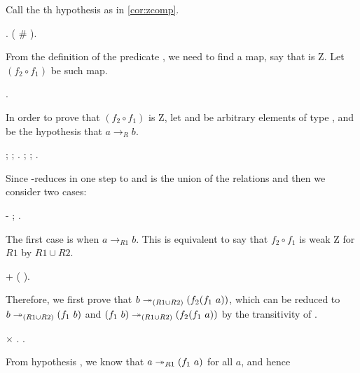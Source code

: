   Call  the th hypothesis as in \ref{cor:zcomp}. \begin{coqdoccode}
\coqdocemptyline
\coqdocindent{1.00em}
 . \coqdoctac{\ensuremath{\exists}} ( \# ). \end{coqdoccode}
From the definition of the
  predicate , we need to find a map, say  that is Z. Let
  $(f_2 \circ f_1)$ be such map.  \begin{coqdoccode}
\coqdocemptyline
\coqdocindent{1.00em}
   . \end{coqdoccode}
In order to prove that $(f_2 \circ f_1)$ is Z,
  let  and  be arbitrary elements of type , and  be the
  hypothesis that $a \to_{R} b$. \begin{coqdoccode}
\coqdocemptyline
\coqdocindent{1.00em}
 ; ;  .  ; ;  . \end{coqdoccode}
  Since  -reduces in one step to  and  is the union of the
  relations  and  then we consider two cases: \begin{coqdoccode}
\coqdocemptyline
\coqdocindent{1.00em}
-  ; . \end{coqdoccode}
The first case is when $a \to_{R1}
    b$. This is equivalent to say that $f_2 \circ f_1$ is weak Z for
    $R1$ by $R1 \cup R2$. \begin{coqdoccode}
\coqdocemptyline
\coqdocindent{2.00em}
+    ( ). \end{coqdoccode}
Therefore, we first
    prove that $b \twoheadrightarrow_{(R1\cup R2)} (f_2 (f_1\ a))$, which can be
    reduced to $b \twoheadrightarrow_{(R1\cup R2)} (f_1\ b)$ and $(f_1\ b)
    \twoheadrightarrow_{(R1\cup R2)} (f_2 (f_1\ a))$ by the transitivity of
    . \begin{coqdoccode}
\coqdocemptyline
\coqdocindent{3.00em}
\ensuremath{\times}  .  . \end{coqdoccode}
From hypothesis , we
        know that $a \twoheadrightarrow_{R1} (f_1\ a)$ for all $a$, and hence
